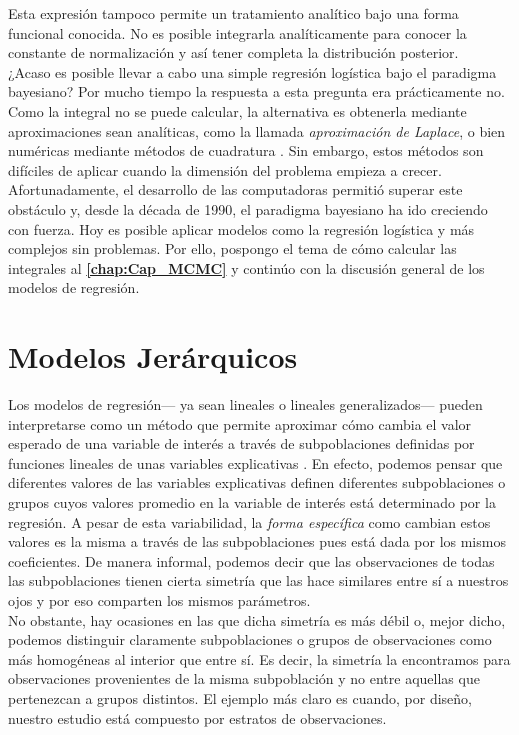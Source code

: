 Esta expresión tampoco permite un tratamiento analítico bajo una forma funcional conocida. No es posible integrarla analíticamente para conocer la constante de normalización y así tener completa la distribución posterior.\\

¿Acaso es posible llevar a cabo una simple regresión logística bajo el paradigma bayesiano? Por mucho tiempo la respuesta a esta pregunta era prácticamente no. Como la integral no se puede calcular, la alternativa es obtenerla mediante aproximaciones sean analíticas, como la llamada \textit{aproximación de Laplace}, o bien numéricas mediante métodos de cuadratura \parencites{Nieto16,GP97}. Sin embargo, estos métodos son difíciles de aplicar cuando la dimensión del problema empieza a crecer.\\ 

Afortunadamente, el desarrollo de las computadoras permitió superar este obstáculo y, desde la década de 1990, el paradigma bayesiano ha ido creciendo con fuerza. Hoy es posible aplicar modelos como la regresión logística y más complejos sin problemas. Por ello, pospongo el tema de cómo calcular las integrales al \textbf{\autoref{chap:Cap_MCMC}} y continúo con la discusión general de los modelos de regresión. 

\section{Modelos Jerárquicos}

Los modelos de regresión--- ya sean lineales o lineales generalizados--- pueden interpretarse como un método que permite aproximar cómo cambia el valor esperado de una variable de interés a través de subpoblaciones definidas por funciones lineales de unas variables explicativas \parencite{GelmanHill06}. En efecto, podemos pensar que diferentes valores de las variables explicativas definen diferentes subpoblaciones o grupos cuyos valores promedio en la variable de interés está determinado por la regresión. A pesar de esta variabilidad, la \textit{forma específica} como cambian estos valores es la misma a través de las subpoblaciones pues está dada por los mismos coeficientes. De manera informal, podemos decir que las observaciones de todas las subpoblaciones tienen cierta simetría que las hace similares entre sí a nuestros ojos y por eso comparten los mismos parámetros.\\ 

No obstante, hay ocasiones en las que dicha simetría es más débil o, mejor dicho, podemos distinguir claramente subpoblaciones o grupos de observaciones como más homogéneas al interior que entre sí. Es decir, la simetría la encontramos para observaciones provenientes de la misma subpoblación y no entre aquellas que pertenezcan a grupos distintos. El ejemplo más claro es cuando, por diseño, nuestro estudio está compuesto por estratos de observaciones.\\ 

